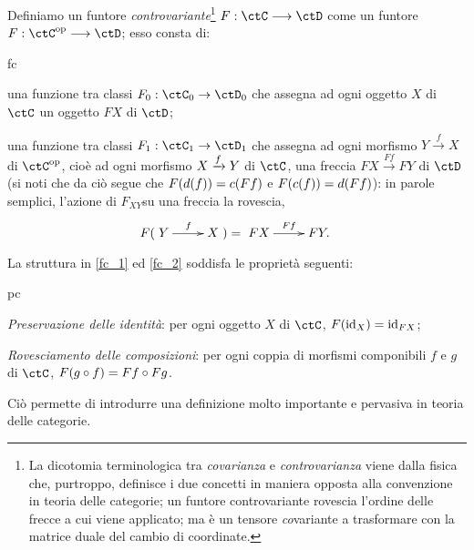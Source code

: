 \begin{definition}\label{def_funtore_contro}
	Definiamo un funtore \emph{controvariante}\footnote{La dicotomia terminologica tra \emph{covarianza} e \emph{controvarianza} viene dalla fisica che, purtroppo, definisce i due concetti in maniera opposta alla convenzione in teoria delle categorie; un funtore controvariante rovescia l'ordine delle frecce a cui viene applicato; ma è un tensore \emph{co}variante a trasformare con la matrice duale del cambio di coordinate.} \(F : \ctC \fun\ctD\) come un funtore \(F : \ctC^\op\fun\ctD\); esso consta di:
	\begin{enumtag}{fc}
		\item \label{fc_1} una funzione tra classi \(F_0 : \ctC_0\to\ctD_0\) che assegna ad ogni oggetto \(X\) di \(\ctC\) un oggetto \(FX\) di \(\ctD\);
		\item \label{fc_2} una funzione tra classi \(F_1 : \ctC_1\to\ctD_1\) che assegna ad ogni morfismo \(Y \xrightarrow{f} X\) di \(\ctC^\op\), cioè ad ogni morfismo \(X\xrightarrow{f} Y\) di \(\ctC\), una freccia \(FX \xrightarrow{Ff} FY\) di \(\ctD\) (si noti che da ciò segue che \(F(d(f))=c(Ff)\) e \(F(c(f))=d(Ff)\)): in parole semplici, l'azione di \(F_{XY}\)su una freccia la rovescia,
		\[F(\xymatrix{Y \ar[r]^f & X}) = \xymatrix{FX \ar[r]^{Ff} & FY.}\]
	\end{enumtag}
	La struttura in \ref{fc_1} ed \ref{fc_2} soddisfa le proprietà seguenti:
	\begin{enumtag}{pc}
		\item \label{pc_1} \emph{Preservazione delle identità}: per ogni oggetto \(X\) di \(\ctC\), \(F(\mathrm{id}_X)=\mathrm{id}_{FX}\);
		\item \label{pc_2} \emph{Rovesciamento delle composizioni}: per ogni coppia di morfismi componibili \(f\) e \(g\) di \(\ctC\), \(F(g\circ f)=Ff\circ Fg\).
	\end{enumtag}
\end{definition}
Ciò permette di introdurre una definizione molto importante e pervasiva in teoria delle categorie.
